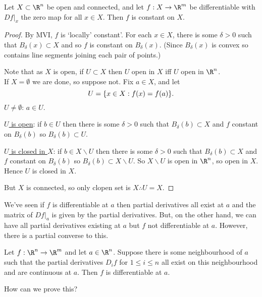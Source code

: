 \begin{corollary} \label{cor:2.8}
    Let $X\subset \R^n$ be open and connected, and let $f:X\to \R^m$ be differentiable with $Df|_x$ the zero map for all $x\in X$. Then $f$ is constant on $X$.
\end{corollary}

\begin{proof}
    By MVI, $f$ is `locally' constant'. For each $x\in X$, there is some $\delta > 0$ such that $B_\delta(x)\subset X$ and so $f$ is constant on $B_\delta(x)$. (Since $B_\delta(x)$ is convex so contains line segments joining each pair of points.)

    Note that as $X$ is open, if $U\subset X$ then $U$ open in $X$ iff $U$ open in $\R^n$. \\
    If $X=\emptyset$ we are done, so suppose not.
    Fix $a\in X$, and let \[ U = \{x\in X : f(x) = f(a)\}. \]
    \underline{$U\neq \emptyset$}: $a\in U$.

    \underline{$U$ is open}: if $b\in U$ then there is some $\delta>0$ such that $B_\delta(b)\subset X$ and $f$ constant on $B_\delta(b)$ so $B_\delta(b)\subset U$.

    \underline{$U$ is closed in $X$}: if $b\in X\backslash U$ then there is some $\delta > 0$ such that $B_\delta(b) \subset X$ and $f$ constant on $B_\delta(b)$ so $B_\delta(b)\subset X\backslash U$. So $X\backslash U$ is open in $\R^n$, so open in $X$. Hence $U$ is closed in $X$.

    But $X$ is connected, so only clopen set is $X \therefore U =X$.
\end{proof}

We've seen if $f$ is differentiable at $a$ then partial derivatives all exist at $a$ and the matrix of $Df|_a$ is given by the partial derivatives.
But, on the other hand, we can have all partial derivatives existing at $a$ but $f$ not differentiable at $a$.
However, there is a partial converse to this.

\begin{theorem} \label{thm:4.9}
    Let $f:\R^n\to\R^m$ and let $a\in \R^n$. Suppose there is some neighbourhood of $a$ such that the partial derivatives $D_if$ for $1\leq i \leq n$ all exist on this neighbourhood and are continuous at $a$.
    Then $f$ is differentiable at $a$.
\end{theorem}

How can we prove this?

